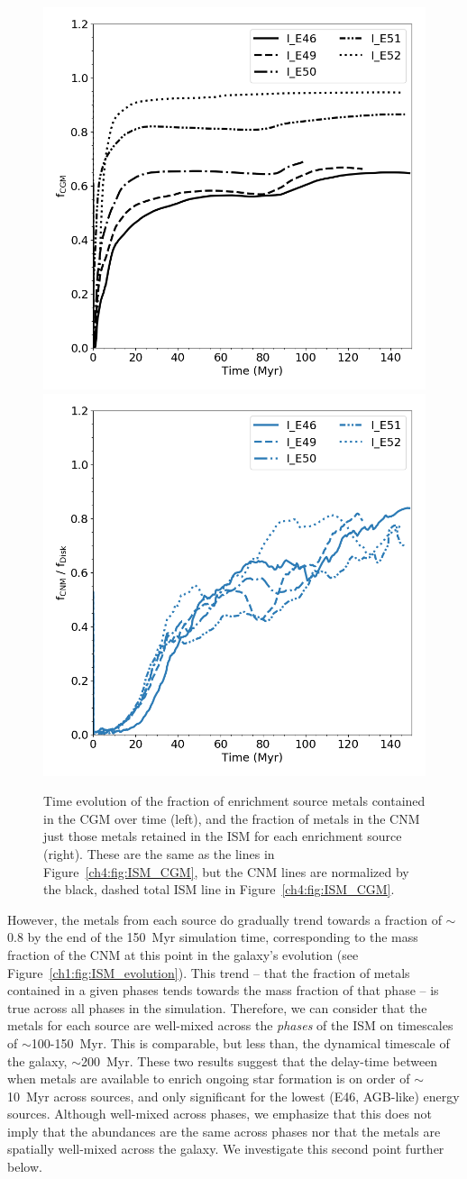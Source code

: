 \begin{figure}
  \centering
  \includegraphics[width=0.45\linewidth]{figures/ch4/CGM_average_evolution}
  \includegraphics[width=0.45\linewidth]{figures/ch4/CNM_average_evolution}
  \caption{Time evolution of the fraction of enrichment source metals contained in the CGM over time (left), and the fraction of metals in the CNM just those metals retained in the ISM for each enrichment source (right). These are the same as the lines in Figure~\ref{ch4:fig:ISM_CGM}, but the CNM lines are normalized by the black, dashed total ISM line in Figure~\ref{ch4:fig:ISM_CGM}.}
  \label{ch4:fig:CGM_CNM}
\end{figure}

However, the metals from each source do gradually trend towards a fraction of $\sim$0.8 by the end of the 150~Myr simulation time, corresponding to the mass fraction of the CNM at this point in the galaxy's evolution (see Figure~\ref{ch1:fig:ISM_evolution}). This trend -- that the fraction of metals contained in a given phases tends towards the mass fraction of that phase -- is true across all phases in the simulation. Therefore, we can consider that the metals for each source are well-mixed across the \textit{phases} of the ISM on timescales of $\sim$100-150~Myr. This is comparable, but less than, the dynamical timescale of the galaxy, $\sim$200~Myr. These two results suggest that the delay-time between when metals are available to enrich ongoing star formation is on order of $\sim$10~Myr across sources, and only significant for the lowest (E46, AGB-like) energy sources. Although well-mixed across phases, we emphasize that this does not imply that the abundances are the same across phases nor that the metals are spatially well-mixed across the galaxy. We investigate this second point further below.


